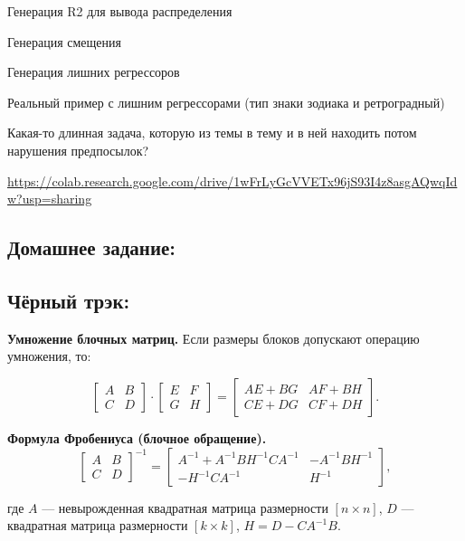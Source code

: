 \documentclass[12pt]{article}
\begin{document}
Генерация R2 для вывода распределения

Генерация смещения

Генерация лишних регрессоров

Реальный пример с лишним регрессорами (тип знаки зодиака и ретроградный)

Какая-то длинная задача, которую из темы в тему и в ней находить потом нарушения предпосылок?



\url{https://colab.research.google.com/drive/1wFrLyGcVVETx96jS93I4z8asgAQwqIdw?usp=sharing}


\subsection{Домашнее задание:}


\subsection{Чёрный трэк:}

\textbf{Умножение блочных матриц.} Если размеры блоков допускают операцию умножения, то:

\[
\left[
\begin{array}{c|c}
A & B \\
\hline
C & D
\end{array}
\right]
\cdot
\left[
\begin{array}{c|c}
E & F \\
\hline
G & H
\end{array}
\right]
=
\left[
\begin{array}{c|c}
AE + BG &  AF+BH\\
\hline
CE+DG & CF+DH
\end{array}
\right].
\]

\bigskip

\textbf{Формула Фробениуса (блочное обращение).}
\[
\left[
\begin{array}{c|c}
A & B \\
\hline
C & D
\end{array}
\right]^{-1}=
\left[
\begin{array}{c|c}
A^{-1}+A^{-1}BH^{-1}CA^{-1} & -A^{-1}BH^{-1} \\
\hline
-H^{-1}CA^{-1} & H^{-1}
\end{array}
\right],
\]

где $A$ — невырожденная квадратная матрица размерности $[n \times n]$, $D$ — квадратная матрица размерности $[k \times k]$, $H = D - CA^{-1}B$.
\end{document}
